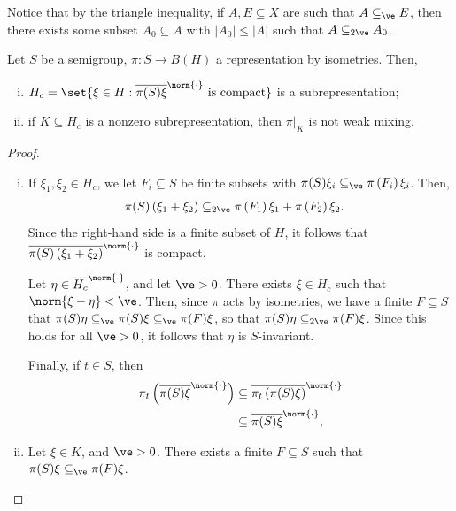 \documentclass[10pt]{mypackage}
\begin{document}
Notice that by the triangle inequality, if $A,E\subseteq X$ are such that $A\subseteq_{\ve}E$, then there exists some subset $A_0\subseteq A$ with $\left\vert A_0 \right\vert\leq \left\vert A \right\vert$ such that $A\subseteq_{2\ve} A_0$.
\begin{proposition}
  Let $S$ be a semigroup, $\pi\colon S\to B(H)$ a representation by isometries. Then,
  \begin{enumerate}[(i)]
    \item $H_c = \set{\xi\in H : \overline{\pi(S)\xi}^{\norm{\cdot}}\text{ is compact}}$ is a subrepresentation;
    \item if $K\subseteq H_c$ is a nonzero subrepresentation, then $\pi|_{K}$ is not weak mixing.
  \end{enumerate}
\end{proposition}
\begin{proof}\hfill
  \begin{enumerate}[(i)]
    \item If $\xi_1,\xi_2\in H_c$, we let $F_i\subseteq S$ be finite subsets with $\pi(S)\xi_i \subseteq_{\ve}\pi\left( F_i \right)\xi_i$. Then,
      \begin{align*}
        \pi(S)\left( \xi_1 + \xi_2 \right) &\subseteq_{2\ve} \pi\left( F_1 \right)\xi_1 + \pi\left( F_2 \right)\xi_2.
      \end{align*}
      Since the right-hand side is a finite subset of $H$, it follows that $ \overline{\pi(S)\left( \xi_1 + \xi_2 \right)}^{\norm{\cdot}} $ is compact.

      Let $\eta\in \overline{H_c}^{\norm{\cdot}}$, and let $\ve > 0$. There exists $\xi\in H_c$ such that $\norm{\xi - \eta} < \ve$. Then, since $\pi$ acts by isometries, we have a finite $F\subseteq S$ that $\pi(S)\eta \subseteq_{\ve}\pi(S)\xi \subseteq_{\ve}\pi(F)\xi$, so that $\pi(S)\eta \subseteq_{2\ve}\pi(F)\xi$. Since this holds for all $\ve > 0$, it follows that $\eta$ is $S$-invariant.

      Finally, if $t\in S$, then
      \begin{align*}
        \pi_t\left( \overline{\pi(S)\xi}^{\norm{\cdot}} \right) &\subseteq \overline{\pi_t\left( \pi(S)\xi \right)}^{\norm{\cdot}}\\
                                                                &\subseteq \overline{\pi(S)\xi}^{\norm{\cdot}},
      \end{align*}
    \item Let $\xi\in K$, and $\ve > 0$. There exists a finite $F\subseteq S$ such that $\pi(S)\xi\subseteq_{\ve} \pi(F)\xi$.


\end{enumerate}
\end{proof}
\end{document}
